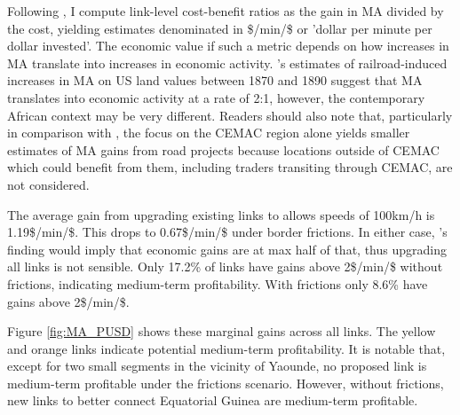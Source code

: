 \documentclass[a4paper]{article}
\begin{document}
Following \citet{krantz2024optimal}, I compute link-level cost-benefit ratios as the gain in MA divided by the cost, yielding estimates denominated in \$/min/\$ or 'dollar per minute per dollar invested'. The economic value if such a metric depends on how increases in MA translate into increases in economic activity.  \citet{donaldson2016railroads}'s estimates of railroad-induced increases in MA on US land values between 1870 and 1890 suggest that MA translates into economic activity at a rate of 2:1, however, the contemporary African context may be very different. Readers should also note that, particularly in comparison with \citet{krantz2024optimal}, the focus on the CEMAC region alone yields smaller estimates of MA gains from road projects because locations outside of CEMAC which could benefit from them, including traders transiting through CEMAC, are not considered. \newline 

The average gain from upgrading existing links to allows speeds of 100km/h is 1.19\$/min/\$. This drops to 0.67\$/min/\$ under border frictions. In either case, \citet{donaldson2016railroads}'s finding would imply that economic gains are at max half of that, thus upgrading all links is not sensible. Only 17.2\% of links have gains above 2\$/min/\$ without frictions, indicating medium-term profitability. With frictions only 8.6\% have gains above 2\$/min/\$. \newline 

Figure \ref{fig:MA_PUSD} shows these marginal gains across all links. The yellow and orange links indicate potential medium-term profitability. It is notable that, except for two small segments in the vicinity of Yaounde, no proposed link is medium-term profitable under the frictions scenario. However, without frictions, new links to better connect Equatorial Guinea are medium-term profitable. 
\end{document}
